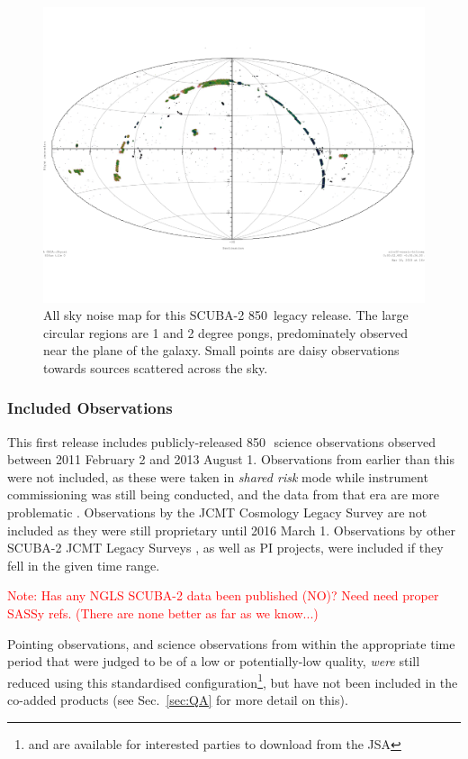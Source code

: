 \documentclass[twocolumn]{aastex6}
\newcommand{\um}{\micron}
\newcommand{\sref}[1]{Sec.~\ref{#1}}
\newcommand{\note}[1]{\textcolor{red}{Note: #1}}
\begin{document}
\begin{figure}
  \centering
  \includegraphics[width=0.9\linewidth]{legacy850-noise-aitoff}
  \caption{All sky noise map for this SCUBA-2 850\,\um{} legacy
    release. The large circular regions are 1 and 2 degree pongs,
    predominately observed near the plane of the galaxy. Small points
    are daisy observations towards sources scattered across the
    sky.}
  \label{fig:noise-aitoff}
\end{figure}

\subsubsection{Included Observations}
This first release includes publicly-released 850\,\um\ science
observations observed between 2011 February 2 and 2013 August
1. Observations from earlier than this were not included, as these
were taken in \emph{shared risk} mode while instrument commissioning
was still being conducted, and the data from that era are more
problematic \citep{SC19,Dempsey2010}.  Observations by the JCMT
Cosmology Legacy Survey \citep{Geach2013} are not included as they were
still proprietary until 2016 March 1. Observations by other SCUBA-2
JCMT Legacy Surveys
\citep[e.g.,][]{ChrysostomouJLS,GBS,SASSy,SONS,JPS}, as well as PI
projects, were included if they fell in the given time
range.

\note{Has any NGLS SCUBA-2 data been published (NO)? Need need proper
  SASSy refs. (There are none better as far as we know...)}

Pointing observations, and science observations from within the
appropriate time period that were judged to be of a low or
potentially-low quality, \emph{were} still reduced using this
standardised configuration\footnote{and are available for interested
  parties to download from the JSA}, but have not been included in the
co-added products (see \sref{sec:QA} for more detail on this).
\end{document}
